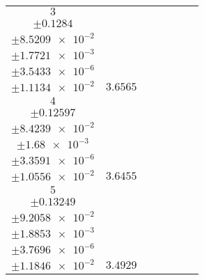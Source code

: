 \documentclass[8pt]{article}
\begin{document}
\begin{longtable}[l]{c c c c c c c}
$\num{3}$ & \begin{tabular}[c]{@{}c@{}}$\num{86.337}$ \\ $\pm\num{0.1284}$\end{tabular} & \begin{tabular}[c]{@{}c@{}}$\num{-0.20101}$ \\ $\pm\num{8.5209e-2}$\end{tabular} & \begin{tabular}[c]{@{}c@{}}$\num{670.12}$ \\ $\pm\num{1.7721e-3}$\end{tabular} & \begin{tabular}[c]{@{}c@{}}$\num{1.3399}$ \\ $\pm\num{3.5433e-6}$\end{tabular} & \begin{tabular}[c]{@{}c@{}}$\num{8.2588}$ \\ $\pm\num{1.1134e-2}$\end{tabular} & $\num{3.6565}$\\
$\num{4}$ & \begin{tabular}[c]{@{}c@{}}$\num{85.676}$ \\ $\pm\num{0.12597}$\end{tabular} & \begin{tabular}[c]{@{}c@{}}$\num{-0.56365}$ \\ $\pm\num{8.4239e-2}$\end{tabular} & \begin{tabular}[c]{@{}c@{}}$\num{674.31}$ \\ $\pm\num{1.68e-3}$\end{tabular} & \begin{tabular}[c]{@{}c@{}}$\num{1.3483}$ \\ $\pm\num{3.3591e-6}$\end{tabular} & \begin{tabular}[c]{@{}c@{}}$\num{7.9341}$ \\ $\pm\num{1.0556e-2}$\end{tabular} & $\num{3.6455}$\\
$\num{5}$ & \begin{tabular}[c]{@{}c@{}}$\num{82.459}$ \\ $\pm\num{0.13249}$\end{tabular} & \begin{tabular}[c]{@{}c@{}}$\num{3.4106e-2}$ \\ $\pm\num{9.2058e-2}$\end{tabular} & \begin{tabular}[c]{@{}c@{}}$\num{683.14}$ \\ $\pm\num{1.8853e-3}$\end{tabular} & \begin{tabular}[c]{@{}c@{}}$\num{1.3659}$ \\ $\pm\num{3.7696e-6}$\end{tabular} & \begin{tabular}[c]{@{}c@{}}$\num{8.2456}$ \\ $\pm\num{1.1846e-2}$\end{tabular} & $\num{3.4929}$\\

\end{longtable}
\end{document}
